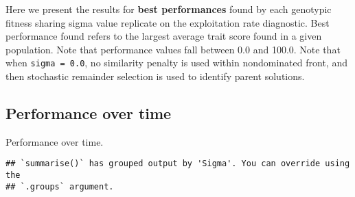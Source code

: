\documentclass[]{book}
\newenvironment{Shaded}{\begin{snugshade}}{\end{snugshade}}
\newcommand{\DataTypeTok}[1]{\textcolor[rgb]{0.13,0.29,0.53}{#1}}
\newcommand{\KeywordTok}[1]{\textcolor[rgb]{0.13,0.29,0.53}{\textbf{#1}}}
\newcommand{\NormalTok}[1]{#1}
\newcommand{\OperatorTok}[1]{\textcolor[rgb]{0.81,0.36,0.00}{\textbf{#1}}}
\newcommand{\StringTok}[1]{\textcolor[rgb]{0.31,0.60,0.02}{#1}}
\begin{document}
Here we present the results for \textbf{best performances} found by each genotypic fitness sharing sigma value replicate on the exploitation rate diagnostic.
Best performance found refers to the largest average trait score found in a given population.
Note that performance values fall between 0.0 and 100.0.
Note that when \texttt{sigma\ =\ 0.0}, no similarity penalty is used within nondominated front, and then stochastic remainder selection is used to identify parent solutions.

\hypertarget{performance-over-time-18}{%
\subsection{Performance over time}\label{performance-over-time-18}}

Performance over time.

\begin{Shaded}
\end{Shaded}

\begin{verbatim}
## `summarise()` has grouped output by 'Sigma'. You can override using the
## `.groups` argument.
\end{verbatim}
\end{document}
